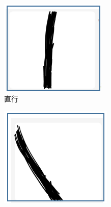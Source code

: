 \documentclass{report}
\begin{document}
\begin{figure}[ht]
  \centering
   \begin{subfigure}[b]{0.3\textwidth}
     \centering
     \includegraphics[width=\textwidth]{figures/straight.png}
     \caption{直行}
     \label{fig:label}
   \end{subfigure}
   \hfill
 \begin{subfigure}[b]{0.3\textwidth}
   \centering
   \includegraphics[width=\textwidth]{figures/left.png}

\end{subfigure}
\end{figure}
\end{document}
